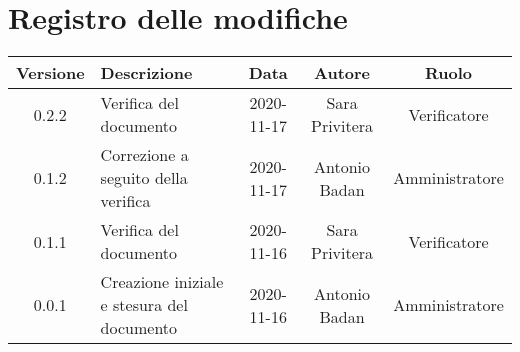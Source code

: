 \section*{Registro delle modifiche}

\begin{center}
	\begin{longtable}{|c|p{5cm}|c|c|c|}
	\hline
	\rowcolor{lighter-grayer}
	\textbf{Versione} & \textbf{Descrizione} & \textbf{Data} & \textbf{Autore} & \textbf{Ruolo} \\
	\hline
	\endfirsthead


	0.2.2 & Verifica del documento & 2020-11-17 & Sara Privitera & Verificatore \\
	\hline
	0.1.2 & Correzione a seguito della verifica & 2020-11-17 & Antonio Badan & Amministratore \\
	\hline
	0.1.1 & Verifica del documento & 2020-11-16 & Sara Privitera & Verificatore \\
	\hline
	0.0.1 & Creazione iniziale e stesura del documento & 2020-11-16 & Antonio Badan & Amministratore \\
	\hline
	\end{longtable}
\end{center}
